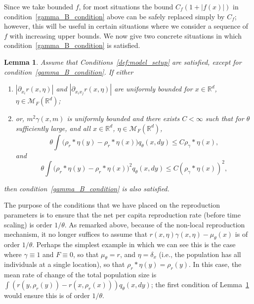 \documentclass[12pt]{article}
\newtheorem{lemma}[theorem]{Lemma}
\newcommand{\IR}{\mathbb R}
\newcommand{\kernel}{\rho}  %
\newcommand{\smooth}[1]{\kernel_{#1} \! * \!}  %
\newcommand{\measures}{\mathcal{M}_F(\IR^d)} %
\numberwithin{equation}{section}
\begin{document}
Since we take bounded $f$,
for most situations the bound $C_f(1+|f(x)|)$ in condition~\ref{gamma_B_condition} above
can be safely replaced simply by $C_f$;
however, this will be useful
in certain situations where we consider a sequence of $f$ with increasing upper bounds.
We now give two concrete situations in which condition~\ref{gamma_B_condition} is satisfied.

\begin{lemma}
    \label{lem:conditions on r}
    Assume that Conditions~\ref{def:model_setup} are satisfied,
    except for condition~\ref{gamma_B_condition}.
    If either
\begin{enumerate}
\item
\label{control through r} 
    $|\partial_{x_i}r(x,\eta)|$ and 
    $|\partial_{x_ix_j}r(x,\eta)|$
    are uniformly bounded for $x\in\IR^d$, $\eta\in\measures$;
\item 
\label{control through gamma}
    or, $m^2\gamma(x,m)$ is uniformly bounded and there exists $C<\infty$
    such that for $\theta$ sufficiently large, and all $x\in\IR^d$, $\eta\in\measures$,
    \[
    \theta\int\big(\smooth{r}\eta(y)-\smooth{r}\eta(x)\big)q_\theta(x,dy)\leq C\smooth{\gamma}\eta(x),
    \]
    and
    \[\theta\int\big(\smooth{r}\eta(y)-\smooth{r}\eta(x)\big)^2q_\theta(x,dy)
    \leq C(\smooth{\gamma}\eta(x))^2 ,
    \]
\end{enumerate} 
    then condition~\ref{gamma_B_condition} is also satisfied.
\end{lemma}

The purpose of the conditions that we have placed on the reproduction parameters is to 
ensure that the net per capita reproduction rate (before time scaling)
is order $1/\theta$. As remarked above, 
because of the non-local reproduction mechanism, it no longer suffices to assume that 
$r(x,\eta)\gamma(x,\eta)-\mu_\theta(x)$ is of order $1/\theta$.
Perhaps the simplest example in which we can see this
is the case where $\gamma \equiv 1$ and $F \equiv 0$, so that $\mu_\theta = r$,
and $\eta = \delta_x$
(i.e., the population has all individuals at a single location),
so that $\smooth{r} \eta(y) = \rho_r(y)$.
In this case, the mean rate of change of the total population size
is $\int (r(y, \rho_r(y) ) - r(x, \rho_r(x))) q_\theta(x, dy)$;
the first condition of Lemma~\ref{lem:conditions on r} would ensure this is of order $1/\theta$.
\end{document}
